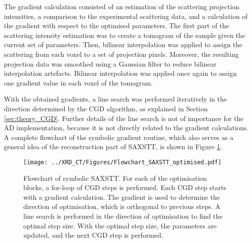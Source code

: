 The gradient calculation consisted of an estimation of the scattering projection intensities, a comparison to the experimental scattering data,
and a calculation of the gradient with respect to the optimised parameters.
The first part of the scattering intensity estimation was to create a tomogram of the sample given the current set of parameters.
Then, bilinear interpolation was applied to assign the scattering from each voxel to a set of projection pixels.
Moreover, the resulting projection data was smoothed using a Gaussian filter to reduce bilinear interpolation artefacts.
Bilinear interpolation was applied once again to assign one gradient value in each voxel of the tomogram. %

With the obtained gradients, a line search was performed iteratively in the direction determined by the CGD algorithm, as explained in Section \ref{sec:theory_CGD}.
Further details of the line search is not of importance for the AD implementation, because it is not directly related to the gradient calculations.
A complete flowchart of the symbolic gradient routine, which also serves as a general idea of the reconstruction part of SAXSTT, is shown in Figure \ref{fig:flowchart_SAXSTT}.



\begin{figure}
    \centering
    \texttt{[image: ../XRD\_CT/Figures/Flowchart\_SAXSTT\_optimised.pdf]} %
    \caption[Flowchart of Symbolic SAXSTT]{Flowchart of symbolic SAXSTT.
        For each of the optimisation blocks, a for-loop of CGD steps is performed.
        Each CGD step starts with a gradient calculation.
        The gradient is used to determine the direction of optimisation, which is orthogonal to previous steps.
        A line search is performed in the direction of optimisation to find the optimal step size.
        With the optimal step size, the parameters are updated, and the next CGD step is performed.
    }
    \label{fig:flowchart_SAXSTT}
\end{figure}

